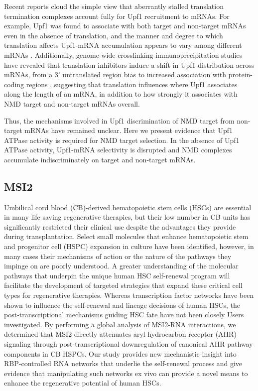 Recent reports cloud the simple view that aberrantly stalled translation termination complexes account fully for Upf1 recruitment to mRNAs. For example, Upf1 was found to associate with both target and non-target mRNAs even in the absence of translation, and the manner and degree to which translation affects Upf1-mRNA accumulation appears to vary among different mRNAs \cite{Hogg2010, Kurosaki2013a, Kurosaki2014, Zund2013}. Additionally, genome-wide crosslinking-immunoprecipitation studies have revealed that translation inhibitors induce a shift in Upf1 distribution across mRNAs, from a 3’ untranslated region bias to increased association with protein-coding regions \cite{Gregersen2014, Hurt2013, Zund2013}, suggesting that translation influences where Upf1 associates along the length of an mRNA, in addition to how strongly it associates with NMD target and non-target mRNAs overall.

Thus, the mechanisms involved in Upf1 discrimination of NMD target from non-target mRNAs have remained unclear. Here we present evidence that Upf1 ATPase activity is required for NMD target selection. In the absence of Upf1 ATPase activity, Upf1-mRNA selectivity is disrupted and NMD complexes accumulate indiscriminately on target and non-target mRNAs.

\subsection{MSI2}
Umbilical cord blood (CB)-derived hematopoietic stem cells (HSCs) are essential in many life saving regenerative therapies, but their low number in CB units has significantly restricted their clinical use despite the advantages they provide during transplantation\cite{Miller2013}. Select small molecules that enhance hematopoietic stem and progenitor cell (HSPC) expansion in culture have been identified\cite{Boitano2010, Fares2014}, however, in many cases their mechanisms of action or the nature of the pathways they impinge on are poorly understood. A greater understanding of the molecular pathways that underpin the unique human HSC self-renewal program will facilitate the development of targeted strategies that expand these critical cell types for regenerative therapies. Whereas transcription factor networks have been shown to influence the self-renewal and lineage decisions of human HSCs\cite{Novershtern2011, Laurenti2013}, the post-transcriptional mechanisms guiding HSC fate have not been closely Users investigated.  By performing a global analysis of MSI2-RNA interactions, we determined that MSI2 directly attenuates aryl hydrocarbon receptor (AHR) signaling through post-transcriptional downregulation of canonical AHR pathway components in CB HSPCs. Our study provides new mechanistic insight into RBP-controlled RNA networks that underlie the self-renewal process and give evidence that manipulating such networks ex vivo can provide a novel means to enhance the regenerative potential of human HSCs.

